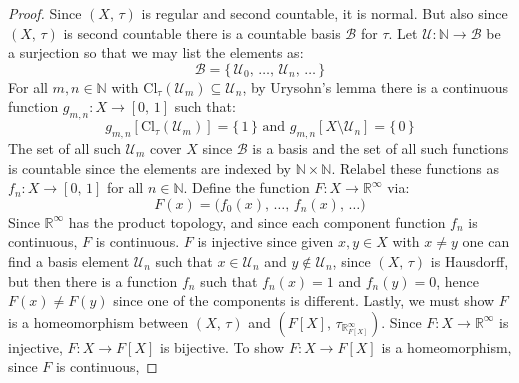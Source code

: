 \documentclass{article}
\theoremstyle{plain}
\begin{document}
        \begin{proof}
            Since $(X,\,\tau)$ is regular and second countable, it is normal.
            But also since $(X,\,\tau)$ is second countable there is a countable
            basis $\mathcal{B}$ for $\tau$. Let
            $\mathcal{U}:\mathbb{N}\rightarrow\mathcal{B}$ be a surjection so
            that we may list the elements as:
            \begin{equation}
                \mathcal{B}=
                \{\,\mathcal{U}_{0},\,\dots,\,\mathcal{U}_{n},\,\dots\,\}
            \end{equation}
            For all $m,n\in\mathbb{N}$ with
            $\textrm{Cl}_{\tau}(\mathcal{U}_{m})\subseteq\mathcal{U}_{n}$,
            by Urysohn's lemma there is a continuous function
            $g_{m,n}:X\rightarrow[0,\,1]$ such that:
            \begin{equation}
                g_{m,n}[\textrm{Cl}_{\tau}(\mathcal{U}_{m})]=\{\,1\,\}
                \textrm{ and }
                g_{m,n}[X\setminus\mathcal{U}_{n}]=\{\,0\,\}
            \end{equation}
            The set of all such $\mathcal{U}_{m}$ cover $X$ since $\mathcal{B}$
            is a basis and the set of all such functions is countable since
            the elements are indexed by $\mathbb{N}\times\mathbb{N}$. Relabel
            these functions as $f_{n}:X\rightarrow[0,\,1]$ for all
            $n\in\mathbb{N}$. Define the function
            $F:X\rightarrow\mathbb{R}^{\infty}$ via:
            \begin{equation}
                F(x)=\big(f_{0}(x),\,\dots,\,f_{n}(x),\,\dots)
            \end{equation}
            Since $\mathbb{R}^{\infty}$ has the product topology, and since each
            component function $f_{n}$ is continuous, $F$ is continuous. $F$
            is injective since given $x,y\in{X}$ with $x\ne{y}$ one can find
            a basis element $\mathcal{U}_{n}$ such that $x\in\mathcal{U}_{n}$
            and $y\notin\mathcal{U}_{n}$, since $(X,\,\tau)$ is Hausdorff, but
            then there is a function $f_{n}$ such that $f_{n}(x)=1$ and
            $f_{n}(y)=0$, hence $F(x)\ne{F}(y)$ since one of the components
            is different. Lastly, we must show $F$ is a homeomorphism between
            $(X,\,\tau)$ and $(F[X],\,\tau_{\mathbb{R}^{\infty}_{F[X]}})$.
            Since $F:X\rightarrow\mathbb{R}^{\infty}$ is injective,
            $F:X\rightarrow{F}[X]$ is bijective. To show
            $F:X\rightarrow{F}[X]$ is a homeomorphism, since $F$ is continuous,

\end{proof}
\end{document}
